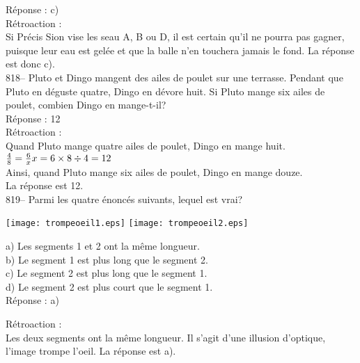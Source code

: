 ﻿\documentclass[letterpaper, 12pt]{article}
\begin{document}
R\'eponse : c)\\

R\'etroaction : \\
Si Pr\'ecis Sion vise les seau A, B ou D, il est certain qu'il ne pourra pas
gagner, puisque leur eau est gel\'ee et que la balle n'en touchera jamais le
fond.  La r\'eponse est donc c).\\

818-- Pluto et Dingo mangent des ailes de poulet sur une terrasse.  Pendant
que Pluto en d\'eguste quatre, Dingo en d\'evore huit.  Si Pluto mange six
ailes de poulet, combien Dingo en mange-t-il?\\

R\'eponse : 12\\

R\'etroaction : \\
Quand Pluto mange quatre ailes de poulet, Dingo en mange huit.\\[2mm]
$\frac{4}{8}=\frac{6}{x}\\[2mm]
x=6\times8\div4=12$\\[2mm]
Ainsi, quand Pluto mange six ailes de poulet, Dingo en mange douze.\\[2mm]
La r\'eponse est 12.\\





819-- Parmi les quatre \'enonc\'es suivants, lequel est vrai?\\
    \begin{center}
    \texttt{[image: trompeoeil1.eps]}
\texttt{[image: trompeoeil2.eps]}
    \end{center}
a) Les segments 1 et 2 ont la m\^eme longueur.\\
b) Le segment 1 est plus long que le segment 2.\\
c) Le segment 2 est plus long que le segment 1.\\
d) Le segment 2 est plus court que le segment 1.\\

R\'eponse : a)

R\'etroaction : \\
Les deux segments ont la m\^eme longueur.  Il s'agit d'une illusion
d'optique, l'image trompe l'oeil.  La r\'eponse est a).\\
\end{document}
